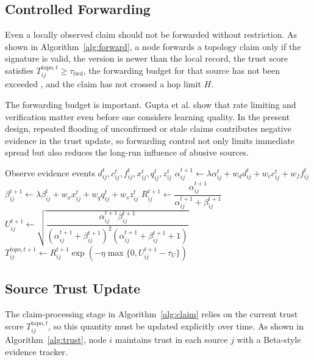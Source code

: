 \documentclass[journal]{IEEEtran}
\theoremstyle{definition}
\theoremstyle{remark}
\begin{document}
\subsection{Controlled Forwarding}

Even a locally observed claim should not be forwarded without restriction. As shown in Algorithm~\ref{alg:forward}, a node forwards a topology claim only if the signature is valid, the version is newer than the local record, the trust score satisfies $T_{ij}^{\text{topo},t} \ge \tau_{\text{fwd}}$, the forwarding budget for that source has not been exceeded \cite{gupta2025fully}, and the claim has not crossed a hop limit $H$.

The forwarding budget is important. Gupta et al. \cite{gupta2025fully} show that rate limiting and verification matter even before one considers learning quality. In the present design, repeated flooding of unconfirmed or stale claims contributes negative evidence in the trust update, so forwarding control not only limits immediate spread but also reduces the long-run influence of abusive sources.

\begin{algorithm}[t]
\caption{Source-trust update}
\label{alg:trust}
\begin{algorithmic}[1]
\State Observe evidence events $d_{ij}^t,c_{ij}^t,f_{ij}^t,x_{ij}^t,q_{ij}^t,z_{ij}^t$
\State $\alpha_{ij}^{t+1} \gets \lambda \alpha_{ij}^{t} + w_d d_{ij}^t + w_c c_{ij}^t + w_f f_{ij}^t$
\State $\beta_{ij}^{t+1} \gets \lambda \beta_{ij}^{t} + w_x x_{ij}^t + w_q q_{ij}^t + w_s z_{ij}^t$
\State $R_{ij}^{t+1} \gets \dfrac{\alpha_{ij}^{t+1}}{\alpha_{ij}^{t+1}+\beta_{ij}^{t+1}}$
\State $U_{ij}^{t+1} \gets \sqrt{\dfrac{\alpha_{ij}^{t+1}\beta_{ij}^{t+1}}
{(\alpha_{ij}^{t+1}+\beta_{ij}^{t+1})^2(\alpha_{ij}^{t+1}+\beta_{ij}^{t+1}+1)}}$
\State $T_{ij}^{topo,t+1} \gets R_{ij}^{t+1}\exp\!\left(-\eta \max\{0,U_{ij}^{t+1}-\tau_U\}\right)$
\end{algorithmic}
\end{algorithm}

\subsection{Source Trust Update}

The claim-processing stage in Algorithm~\ref{alg:claim} relies on the current trust score $T_{ij}^{\text{topo},t}$, so this quantity must be updated explicitly over time. As shown in Algorithm~\ref{alg:trust}, node $i$ maintains trust in each source $j$ with a Beta-style evidence tracker.
\end{document}
